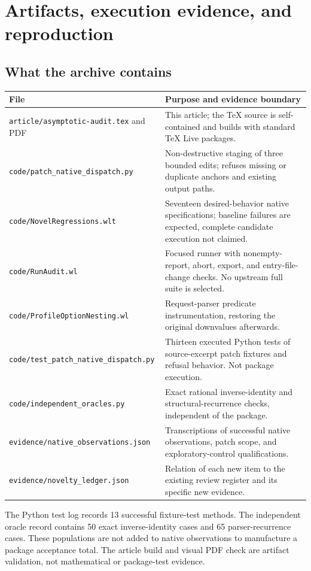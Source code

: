 \documentclass[11pt,letterpaper]{article}
\begin{document}
\section{Artifacts, execution evidence, and reproduction}

\subsection{What the archive contains}

\begin{longtable}{@{}p{}p{}@{}}
\toprule
File & Purpose and evidence boundary\\\midrule\endhead
\nolinkurl{article/asymptotic-audit.tex} and PDF & This article; the TeX source is self-contained and builds with standard TeX Live packages.\\[5pt]
\nolinkurl{code/patch_native_dispatch.py} & Non-destructive staging of three bounded edits; refuses missing or duplicate anchors and existing output paths.\\[5pt]
\nolinkurl{code/NovelRegressions.wlt} & Seventeen desired-behavior native specifications; baseline failures are expected, complete candidate execution not claimed.\\[5pt]
\nolinkurl{code/RunAudit.wl} & Focused runner with nonempty-report, abort, export, and entry-file-change checks. No upstream full suite is selected.\\[5pt]
\nolinkurl{code/ProfileOptionNesting.wl} & Request-parser predicate instrumentation, restoring the original downvalues afterwards.\\[5pt]
\nolinkurl{code/test_patch_native_dispatch.py} & Thirteen executed Python tests of source-excerpt patch fixtures and refusal behavior. Not package execution.\\[5pt]
\nolinkurl{code/independent_oracles.py} & Exact rational inverse-identity and structural-recurrence checks, independent of the package.\\[5pt]
\nolinkurl{evidence/native_observations.json} & Transcriptions of successful native observations, patch scope, and exploratory-control qualifications.\\[5pt]
\nolinkurl{evidence/novelty_ledger.json} & Relation of each new item to the existing review register and its specific new evidence.\\
\bottomrule
\end{longtable}

The Python test log records 13 successful fixture-test methods. The independent
oracle record contains 50 exact inverse-identity cases and 65 parser-recurrence
cases. These populations are not added to native observations to manufacture
a package acceptance total. The article build and visual PDF check are artifact
validation, not mathematical or package-test evidence.
\end{document}
